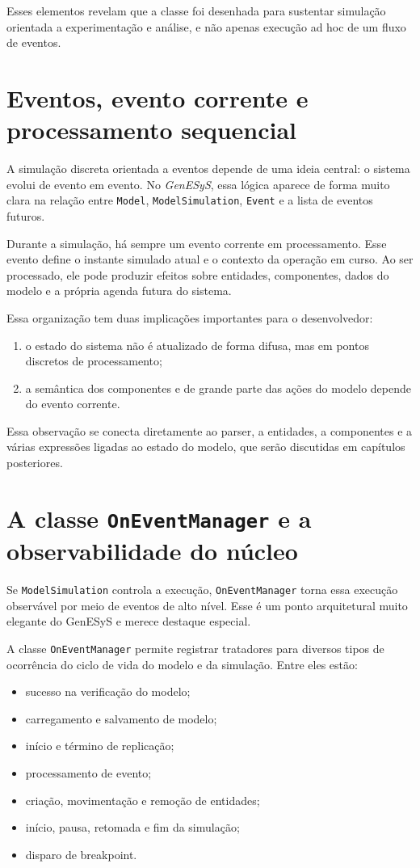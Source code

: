 Esses elementos revelam que a classe foi desenhada para sustentar simulação orientada a experimentação e análise, e não apenas execução ad hoc de um fluxo de eventos.

\section{Eventos, evento corrente e processamento sequencial}
\label{sec:cap7_eventos_evento_corrente_processamento}

A simulação discreta orientada a eventos depende de uma ideia central: o sistema evolui de evento em evento. No \textit{GenESyS}, essa lógica aparece de forma muito clara na relação entre \texttt{Model}, \texttt{ModelSimulation}, \texttt{Event} e a lista de eventos futuros.

Durante a simulação, há sempre um evento corrente em processamento. Esse evento define o instante simulado atual e o contexto da operação em curso. Ao ser processado, ele pode produzir efeitos sobre entidades, componentes, dados do modelo e a própria agenda futura do sistema.

Essa organização tem duas implicações importantes para o desenvolvedor:
\begin{enumerate}
    \item o estado do sistema não é atualizado de forma difusa, mas em pontos discretos de processamento;
    \item a semântica dos componentes e de grande parte das ações do modelo depende do evento corrente.
\end{enumerate}

Essa observação se conecta diretamente ao parser, a entidades, a componentes e a várias expressões ligadas ao estado do modelo, que serão discutidas em capítulos posteriores.

\section{A classe \texttt{OnEventManager} e a observabilidade do núcleo}
\label{sec:cap7_classe_oneventmanager}

Se \texttt{ModelSimulation} controla a execução, \texttt{OnEventManager} torna essa execução observável por meio de eventos de alto nível. Esse é um ponto arquitetural muito elegante do GenESyS e merece destaque especial.

A classe \texttt{OnEventManager} permite registrar tratadores para diversos tipos de ocorrência do ciclo de vida do modelo e da simulação. Entre eles estão:
\begin{itemize}
    \item sucesso na verificação do modelo;
    \item carregamento e salvamento de modelo;
    \item início e término de replicação;
    \item processamento de evento;
    \item criação, movimentação e remoção de entidades;
    \item início, pausa, retomada e fim da simulação;
    \item disparo de breakpoint.
\end{itemize}

